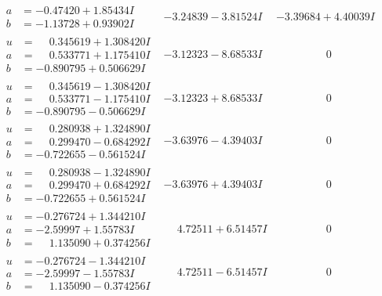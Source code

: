 \documentclass[1p]{elsarticle_modified}
\theoremstyle{definition}
\begin{document}
$$\begin{array}{c|c|c}
\begin{aligned}
a &= -0.47420 + 1.85434 I \\
b &= -1.13728 + 0.93902 I\end{aligned}
 & -3.24839 - 3.81524 I & -3.39684 + 4.40039 I \\ \hline\begin{aligned}
u &= \phantom{-}0.345619 + 1.308420 I \\
a &= \phantom{-}0.533771 + 1.175410 I \\
b &= -0.890795 + 0.506629 I\end{aligned}
 & -3.12323 - 8.68533 I & \phantom{-0.000000 } 0 \\ \hline\begin{aligned}
u &= \phantom{-}0.345619 - 1.308420 I \\
a &= \phantom{-}0.533771 - 1.175410 I \\
b &= -0.890795 - 0.506629 I\end{aligned}
 & -3.12323 + 8.68533 I & \phantom{-0.000000 } 0 \\ \hline\begin{aligned}
u &= \phantom{-}0.280938 + 1.324890 I \\
a &= \phantom{-}0.299470 - 0.684292 I \\
b &= -0.722655 - 0.561524 I\end{aligned}
 & -3.63976 - 4.39403 I & \phantom{-0.000000 } 0 \\ \hline\begin{aligned}
u &= \phantom{-}0.280938 - 1.324890 I \\
a &= \phantom{-}0.299470 + 0.684292 I \\
b &= -0.722655 + 0.561524 I\end{aligned}
 & -3.63976 + 4.39403 I & \phantom{-0.000000 } 0 \\ \hline\begin{aligned}
u &= -0.276724 + 1.344210 I \\
a &= -2.59997 + 1.55783 I \\
b &= \phantom{-}1.135090 + 0.374256 I\end{aligned}
 & \phantom{-}4.72511 + 6.51457 I & \phantom{-0.000000 } 0 \\ \hline\begin{aligned}
u &= -0.276724 - 1.344210 I \\
a &= -2.59997 - 1.55783 I \\
b &= \phantom{-}1.135090 - 0.374256 I\end{aligned}
 & \phantom{-}4.72511 - 6.51457 I & \phantom{-0.000000 } 0 \\ \hline\begin{aligned}

\end{aligned}
\end{array}$$
\end{document}
